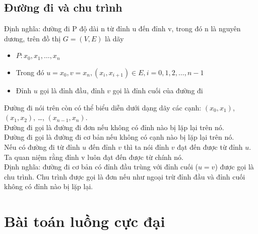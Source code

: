 \subsection{Đường đi và chu trình}
Định nghĩa: đường đi P độ dài n từ đỉnh u đến đỉnh v, trong đó n là nguyên dương, trên đồ thị $G = (V, E)$ là dãy
\begin{itemize}
    \item $P: x_0, x_1, …, x_n$
    \item Trong đó $u = x_0, v = x_n, (x_i, x_{i+1}) \in E, i = 0, 1, 2, …, n-1$
    \item Đỉnh $u$ gọi là đỉnh đầu, đỉnh $v$ gọi là đỉnh cuối của đường đi
\end{itemize}
Đường đi nói trên còn có thể biểu diễn dưới dạng dãy các cạnh: $(x_0, x_1)$, $(x_1, x_2)$, …, $(x_{n-1}, x_n)$.
\\Đường đi gọi là đường đi đơn nếu không có đỉnh nào bị lặp lại trên nó.
\\Đường đi gọi là đường đi cơ bản nếu không có cạnh nào bị lặp lại trên nó.
\\Nếu có đường đi từ đỉnh $u$ đến đỉnh $v$ thì ta nói đỉnh $v$ đạt đến được từ đỉnh $u$. Ta quan niệm rằng đỉnh v luôn đạt đến được từ chính nó.
\\Định nghĩa: đường đi cơ bản có đỉnh đầu trùng với đỉnh cuối ($u = v$) được gọi là chu trình.
Chu trình được gọi là đơn nếu như ngoại trừ đỉnh đầu và đỉnh cuối không có đỉnh nào bị lặp lại.
\section{Bài toán luồng cực đại }
